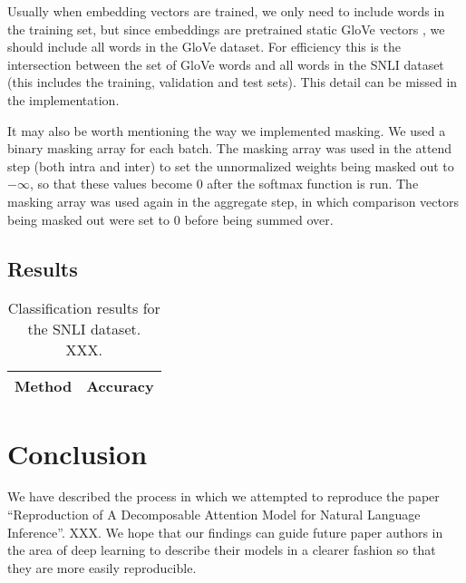 \documentclass{article}
\begin{document}
Usually when embedding vectors are trained, we only need to include words in the training set, but since embeddings are pretrained static GloVe vectors \citep{pennington2014glove}, we should include all words in the GloVe dataset. For efficiency this is the intersection between the set of GloVe words and all words in the SNLI dataset (this includes the training, validation and test sets). This detail can be missed in the implementation.

It may also be worth mentioning the way we implemented masking. We used a binary masking array for each batch. The masking array was used in the attend step (both intra and inter) to set the unnormalized weights being masked out to $-\infty$, so that these values become $0$ after the softmax function is run. The masking array was used again in the aggregate step, in which comparison vectors being masked out were set to $0$ before being summed over.

\subsection{Results}

\begin{table}[htbp]\centering
\begin{tabular}{|l|r|}
    \hline
    Method     & Accuracy \\ \hline
    \hline
\end{tabular}
\caption{Classification results for the SNLI dataset. XXX.}
\label{table:results}
\end{table}

\section{Conclusion}
We have described the process in which we attempted to reproduce the paper ``Reproduction of A Decomposable Attention Model for Natural Language Inference''. XXX. We hope that our findings can guide future paper authors in the area of deep learning to describe their models in a clearer fashion so that they are more easily reproducible.

{}

\end{document}
